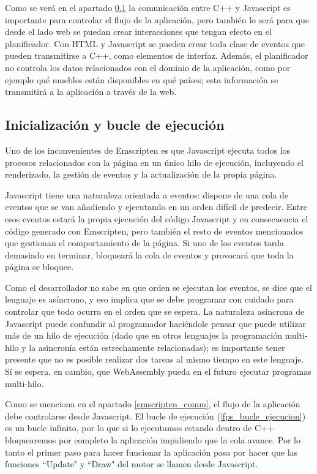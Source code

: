Como se verá en el apartado \ref{init_emscripten} la comunicación entre C++ y Javascript es importante para controlar el flujo de la aplicación, pero también lo será para que desde el lado web se puedan crear interacciones que tengan efecto en el planificador. Con HTML y Javascript se pueden crear toda clase de eventos que pueden transmitirse a C++, como elementos de interfaz. Además, el planificador no controla los datos relacionados con el dominio de la aplicación, como por ejemplo qué muebles están disponibles en qué países; esta información se transmitirá a la aplicación a través de la web.

\subsection{Inicialización y bucle de ejecución}
\label{init_emscripten}
Uno de los inconvenientes de Emscripten es que Javascript ejecuta todos los procesos relacionados con la página en un único hilo de ejecución, incluyendo el renderizado, la gestión de eventos y la actualización de la propia página.

Javascript tiene una naturaleza orientada a eventos: dispone de una cola de eventos que se van añadiendo y ejecutando en un orden difícil de predecir. Entre esos eventos estará la propia ejecución del código Javascript y en consecuencia el código generado con Emscripten, pero también el resto de eventos mencionados que gestionan el comportamiento de la página. Si uno de los eventos tarda demasiado en terminar, bloqueará la cola de eventos y provocará que toda la página se bloquee.

Como el desarrollador no sabe en que orden se ejecutan los eventos, se dice que el lenguaje es asíncrono, y eso implica que se debe programar con cuidado para controlar que todo ocurra en el orden que se espera. La naturaleza asíncrona de Javascript puede confundir al programador haciéndole pensar que puede utilizar más de un hilo de ejecución (dado que en otros lenguajes la programación multi-hilo y la asincronía están estrechamente relacionadas); es importante tener presente que no es posible realizar dos tareas al mismo tiempo en este lenguaje. Sí se espera, en cambio, que WebAssembly pueda en el futuro ejecutar programas multi-hilo.

Como se menciona en el apartado \ref{emscripten_comm}, el flujo de la aplicación debe controlarse desde Javascript. El bucle de ejecución (\ref{fps_bucle_ejecucion}) es un bucle infinito, por lo que si lo ejecutamos estando dentro de C++ bloquearemos por completo la aplicación impidiendo que la cola avance. Por lo tanto el primer paso para hacer funcionar la aplicación pasa por hacer que las funciones ``Update" y ``Draw" del motor se llamen desde Javascript.

